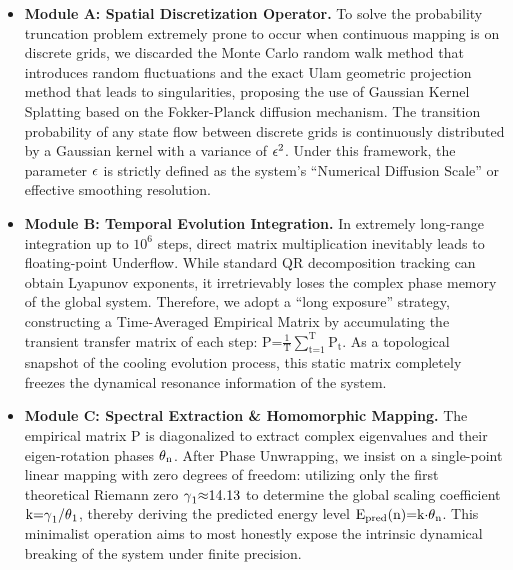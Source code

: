 \documentclass[fleqn,10pt]{wlscirep}
\begin{document}
\begin{itemize}
\item
  \textbf{Module A: Spatial Discretization Operator.} To solve the
  probability truncation problem extremely prone to occur when
  continuous mapping is on discrete grids, we discarded the Monte Carlo
  random walk method that introduces random fluctuations and the exact
  Ulam geometric projection method that leads to singularities,
  proposing the use of Gaussian Kernel Splatting based on the
  Fokker-Planck diffusion mechanism. The transition probability of any
  state flow between discrete grids is continuously distributed by a
  Gaussian kernel with a variance of \(\text{\ensuremath{\epsilon}}^{\text{2}}\). Under this
  framework, the parameter \(\text{\ensuremath{\epsilon}}\) is strictly defined as the
  system's ``Numerical Diffusion Scale'' or effective smoothing
  resolution.
\item
  \textbf{Module B: Temporal Evolution Integration.} In extremely
  long-range integration up to \(\text{10}^{\text{6}}\) steps, direct
  matrix multiplication inevitably leads to floating-point Underflow.
  While standard QR decomposition tracking can obtain Lyapunov
  exponents, it irretrievably loses the complex phase memory of the
  global system. Therefore, we adopt a ``long exposure'' strategy,
  constructing a Time-Averaged Empirical Matrix by accumulating the
  transient transfer matrix of each step:
  \(\text{P}\text{=}\frac{\text{1}}{\text{T}}\sum_{\text{t}\text{=1}}^{\text{T}}\text{P}_{\text{t}}\).
  As a topological snapshot of the cooling evolution process, this
  static matrix completely freezes the dynamical resonance information
  of the system.
\item
  \textbf{Module C: Spectral Extraction \& Homomorphic Mapping.} The
  empirical matrix \(\text{P}\) is diagonalized to extract complex
  eigenvalues and their eigen-rotation phases \(\text{\ensuremath{\theta}}_{\text{n}}\).
  After Phase Unwrapping, we insist on a single-point linear mapping
  with zero degrees of freedom: utilizing only the first theoretical
  Riemann zero \(\text{\ensuremath{\gamma}}_{\text{1}}\text{\ensuremath{\approx}14.13}\) to determine the
  global scaling coefficient
  \(\text{k}\text{=}\text{\ensuremath{\gamma}}_{\text{1}}\text{/}\text{\ensuremath{\theta}}_{\text{1}}\),
  thereby deriving the predicted energy level
  \(\text{E}_{\text{pred}}\text{(}\text{n}\text{)=}\text{k}\text{\ensuremath{\cdot}}\text{\ensuremath{\theta}}_{\text{n}}\).
  This minimalist operation aims to most honestly expose the intrinsic
  dynamical breaking of the system under finite precision.
\end{itemize}
\end{document}
